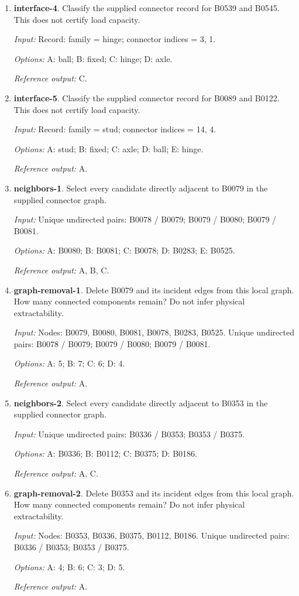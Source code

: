 \begin{enumerate}
\item \textbf{interface-4}. Classify the supplied connector record for B0539 and B0545. This does not certify load capacity.\par {\small \textit{Input:} Record: family = hinge; connector indices = 3, 1. \par\textit{Options:} A: ball; B: fixed; C: hinge; D: axle. \par\textit{Reference output:} C.}
\item \textbf{interface-5}. Classify the supplied connector record for B0089 and B0122. This does not certify load capacity.\par {\small \textit{Input:} Record: family = stud; connector indices = 14, 4. \par\textit{Options:} A: stud; B: fixed; C: axle; D: ball; E: hinge. \par\textit{Reference output:} A.}
\item \textbf{neighbors-1}. Select every candidate directly adjacent to B0079 in the supplied connector graph.\par {\small \textit{Input:} Unique undirected pairs: B0078 / B0079; B0079 / B0080; B0079 / B0081. \par\textit{Options:} A: B0080; B: B0081; C: B0078; D: B0283; E: B0525. \par\textit{Reference output:} A, B, C.}
\item \textbf{graph-removal-1}. Delete B0079 and its incident edges from this local graph. How many connected components remain? Do not infer physical extractability.\par {\small \textit{Input:} Nodes: B0079, B0080, B0081, B0078, B0283, B0525. Unique undirected pairs: B0078 / B0079; B0079 / B0080; B0079 / B0081. \par\textit{Options:} A: 5; B: 7; C: 6; D: 4. \par\textit{Reference output:} A.}
\item \textbf{neighbors-2}. Select every candidate directly adjacent to B0353 in the supplied connector graph.\par {\small \textit{Input:} Unique undirected pairs: B0336 / B0353; B0353 / B0375. \par\textit{Options:} A: B0336; B: B0112; C: B0375; D: B0186. \par\textit{Reference output:} A, C.}
\item \textbf{graph-removal-2}. Delete B0353 and its incident edges from this local graph. How many connected components remain? Do not infer physical extractability.\par {\small \textit{Input:} Nodes: B0353, B0336, B0375, B0112, B0186. Unique undirected pairs: B0336 / B0353; B0353 / B0375. \par\textit{Options:} A: 4; B: 6; C: 3; D: 5. \par\textit{Reference output:} A.}

\end{enumerate}
